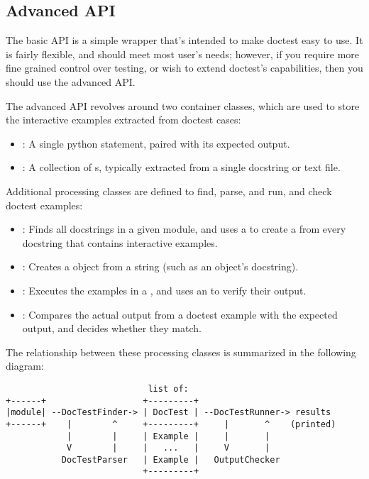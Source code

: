 \subsection{Advanced API\label{doctest-advanced-api}}

The basic API is a simple wrapper that's intended to make doctest easy
to use.  It is fairly flexible, and should meet most user's needs;
however, if you require more fine grained control over testing, or
wish to extend doctest's capabilities, then you should use the
advanced API.

The advanced API revolves around two container classes, which are used
to store the interactive examples extracted from doctest cases:

\begin{itemize}
\item {}: A single python statement, paired with its
      expected output.
\item {}: A collection of s, typically
      extracted from a single docstring or text file.
\end{itemize}

Additional processing classes are defined to find, parse, and run, and
check doctest examples:

\begin{itemize}
\item {}: Finds all docstrings in a given module,
      and uses a  to create a 
      from every docstring that contains interactive examples.
\item {}: Creates a  object from
      a string (such as an object's docstring).
\item {}: Executes the examples in a
      , and uses an  to verify
      their output.
\item {}: Compares the actual output from a
      doctest example with the expected output, and decides whether
      they match.
\end{itemize}

The relationship between these processing classes is summarized in the
following diagram:

\begin{verbatim}
                            list of:
+------+                   +---------+
|module| --DocTestFinder-> | DocTest | --DocTestRunner-> results
+------+    |        ^     +---------+     |       ^    (printed)
            |        |     | Example |     |       |
            V        |     |   ...   |     V       |
           DocTestParser   | Example |   OutputChecker
                           +---------+
\end{verbatim}

